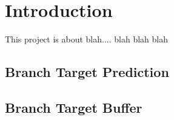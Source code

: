 \section{Introduction}
This project is about blah.... blah blah blah

\subsection{Branch Target Prediction}

\subsection{Branch Target Buffer}
